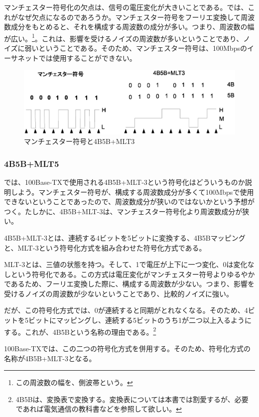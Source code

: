 マンチェスター符号化の欠点は、信号の電圧変化が大きいことである。では、これがなぜ欠点になるのであろうか。マンチェスター符号をフーリエ変換して周波数成分をもとめると、それを構成する周波数の成分が多い。つまり、周波数の幅が広い。\footnote{この周波数の幅を、側波帯という。}。これは、影響を受けるノイズの周波数が多いということであり、ノイズに弱いということである。そのため、マンチェスター符号は、100Mbpsのイーサネットでは使用することができない。

\begin{figure}[htbp]
	\includegraphics[width=12cm,clip]{draw/manchester.eps}
	\caption{マンチェスター符号と4B5B+MLT3}
	\label{fig:manchester}
\end{figure}

\subsubsection{4B5B+MLT5}
では、100Base-TXで使用される4B5B+MLT-3という符号化はどういうものか説明しよう。マンチェスター符号が、構成する周波数成分が多くて100Mbpsで使用できないということであったので、周波数成分が狭いのではないかという予想がつく。たしかに、4B5B+MLT-3は、マンチェスター符号化より周波数成分が狭い。

4B5B+MLT-3とは、連続する4ビットを5ビットに変換する、4B5Bマッピングと、MLT-3という符号化方式を組み合わせた符号化方式である。

MLT-3とは、三値の状態を持つ。そして、1で電圧が上下に一つ変化、0は変化なしという符号化である。この方式は電圧変化がマンチェスター符号よりゆるやかであるため、フーリエ変換した際に、構成する周波数が少ない。つまり、影響を受けるノイズの周波数が少ないということであり、比較的ノイズに強い。

だが、この符号化方式では、0が連続すると同期がとれなくなる。そのため、4ビットを5ビットにマッピングし、連続する5ビットのうち1が二つ以上入るようにする。これが、4B5Bという名称の理由である。\footnote{4B5Bは、変換表で変換する。変換表については本書では割愛するが、必要であれば電気通信の教科書などを参照して欲しい。}

100Base-TXでは、この二つの符号化方式を併用する。そのため、符号化方式の名称が4B5B+MLT-3となる。

